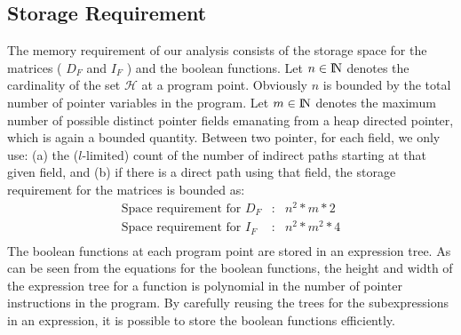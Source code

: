 \documentclass[runningheads,a4paper]{llncs}
\newcommand{\cmt}[1]{} %
\newcommand{\heap}{\ensuremath{\mathcal{H}}}
\newcommand{\nat}{\ensuremath{\bbbn}}
\newcommand{\sub}[2]{\ensuremath{{#1}_{#2}}}
\begin{document}
\subsection{Storage Requirement}

The memory requirement of our analysis consists of the
storage space for the matrices ( $\sub{D}{F}$ and
$\sub{I}{F}$ ) and the boolean functions.  Let $n \in \nat$
denotes the cardinality of the set $\heap$ at a program
point. Obviously $n$ is bounded by the total number of
pointer variables in the program. Let $m \in \nat$ denotes
the maximum number of possible distinct pointer fields
emanating from a heap directed pointer, which is again a
bounded quantity. {\red Between two pointer, for each field, we
only use: (a) the ($l$-limited) count of the number
of indirect paths starting at that given field, and (b) if
there is a direct path using that field, the storage
requirement for the matrices is bounded as:
\begin{eqnarray*}
\mbox{Space requirement for } \sub{D}{F} &:& n^{2}* m * 2 \\
\mbox{Space requirement for } \sub{I}{F} &:& n^{2} * m^2 * 4 \\ 
\end{eqnarray*}
}
The boolean functions at each program point are stored in an
expression tree.  As can be seen from the {\red equations} for the
boolean functions, the height and width of the expression
tree for a function is polynomial in the number of pointer
instructions in the program. By carefully reusing the trees
for the subexpressions in an expression, it is possible to
store the boolean functions efficiently.
\end{document}
